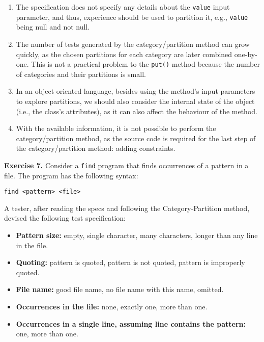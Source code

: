 \begin{enumerate}
\def\labelenumi{\arabic{enumi}.}
\item
  The specification does not specify any details about the
  \texttt{value} input parameter, and thus, experience should be used to
  partition it, e.g., \texttt{value} being null and not null.
\item
  The number of tests generated by the category/partition method can
  grow quickly, as the chosen partitions for each category are later
  combined one-by-one. This is not a practical problem to the
  \texttt{put()} method because the number of categories and their
  partitions is small.
\item
  In an object-oriented language, besides using the method's input
  parameters to explore partitions, we should also consider the internal
  state of the object (i.e., the class's attributes), as it can also
  affect the behaviour of the method.
\item
  With the available information, it is not possible to perform the
  category/partition method, as the source code is required for the last
  step of the category/partition method: adding constraints.
\end{enumerate}

\textbf{Exercise 7.} Consider a \texttt{find} program that finds
occurrences of a pattern in a file. The program has the following
syntax:

\begin{verbatim}
find <pattern> <file>
\end{verbatim}

A tester, after reading the specs and following the Category-Partition
method, devised the following test specification:

\begin{itemize}
\tightlist
\item
  \textbf{Pattern size:} empty, single character, many characters,
  longer than any line in the file.
\item
  \textbf{Quoting:} pattern is quoted, pattern is not quoted, pattern is
  improperly quoted.
\item
  \textbf{File name:} good file name, no file name with this name,
  omitted.
\item
  \textbf{Occurrences in the file:} none, exactly one, more than one.
\item
  \textbf{Occurrences in a single line, assuming line contains the
  pattern:} one, more than one.
\end{itemize}

